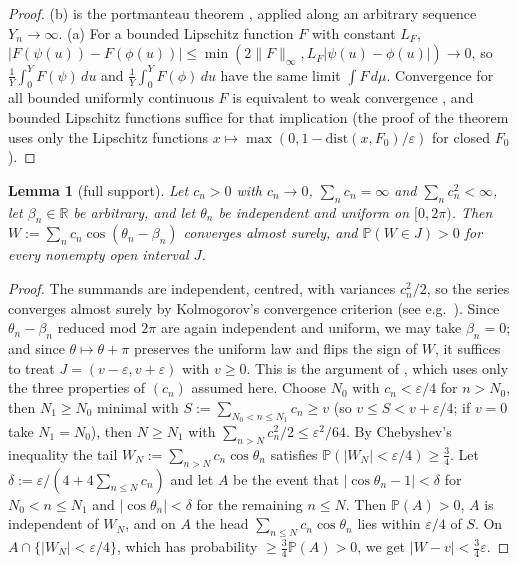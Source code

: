 \documentclass[11pt]{amsart}
\newtheorem{lemma}[theorem]{Lemma}
\theoremstyle{definition}
\numberwithin{equation}{section}
\newcommand{\eps}{\varepsilon}
\newcommand{\PP}{\mathbb P}
\begin{document}
\begin{proof}
(b) is the portmanteau theorem \cite[Theorem~2.1]{Bil99}, applied
along an arbitrary sequence $Y_n\to\infty$. (a) For a bounded
Lipschitz function $F$ with constant $L_F$,
$|F(\psi(u))-F(\phi(u))|\le\min(2\|F\|_\infty,L_F|\psi(u)-\phi(u)|)
\to0$, so $\frac1Y\int_0^YF(\psi)\,du$ and $\frac1Y\int_0^YF(\phi)\,du$
have the same limit $\int F\,d\mu$. Convergence for all bounded
uniformly continuous $F$ is equivalent to weak convergence
\cite[Theorem~2.1]{Bil99}, and bounded Lipschitz functions suffice for
that implication (the proof of the theorem uses only the Lipschitz
functions $x\mapsto\max(0,1-\mathrm{dist}(x,F_0)/\eps)$ for closed
$F_0$).
\end{proof}

\begin{lemma}[full support]\label{lem:fullsupport}
Let $c_n>0$ with $c_n\to0$, $\sum_nc_n=\infty$ and
$\sum_nc_n^2<\infty$, let $\beta_n\in\mathbb R$ be arbitrary, and let
$\theta_n$ be independent and uniform on $[0,2\pi)$. Then
$W:=\sum_nc_n\cos(\theta_n-\beta_n)$ converges almost surely, and
$\PP(W\in J)>0$ for every nonempty open interval $J$.
\end{lemma}

\begin{proof}
The summands are independent, centred, with variances $c_n^2/2$, so
the series converges almost surely by Kolmogorov's convergence
criterion (see e.g.\ \cite[\S VII.8]{Fel71}). Since
$\theta_n-\beta_n$ reduced mod $2\pi$ are again independent and
uniform, we may take $\beta_n=0$; and since $\theta\mapsto\theta+\pi$
preserves the uniform law and flips the sign of $W$, it suffices to
treat $J=(v-\eps,v+\eps)$ with $v\ge0$. This is the argument of
\cite[proof of Theorem~1(ii), ``Full support'']{WR}, which uses only
the three properties of $(c_n)$ assumed here. Choose $N_0$ with
$c_n<\eps/4$ for $n>N_0$, then $N_1\ge N_0$ minimal with
$S:=\sum_{N_0<n\le N_1}c_n\ge v$ (so $v\le S<v+\eps/4$; if $v=0$ take
$N_1=N_0$), then $N\ge N_1$ with $\sum_{n>N}c_n^2/2\le\eps^2/64$. By
Chebyshev's inequality the tail $W_N:=\sum_{n>N}c_n\cos\theta_n$
satisfies $\PP(|W_N|<\eps/4)\ge\tfrac34$. Let
$\delta:=\eps/(4+4\sum_{n\le N}c_n)$ and let $A$ be the event that
$|\cos\theta_n-1|<\delta$ for $N_0<n\le N_1$ and $|\cos\theta_n|<\delta$
for the remaining $n\le N$. Then $\PP(A)>0$, $A$ is independent of
$W_N$, and on $A$ the head $\sum_{n\le N}c_n\cos\theta_n$ lies within
$\eps/4$ of $S$. On $A\cap\{|W_N|<\eps/4\}$, which has probability
$\ge\tfrac34\PP(A)>0$, we get $|W-v|<\tfrac34\eps$.
\end{proof}
\end{document}
